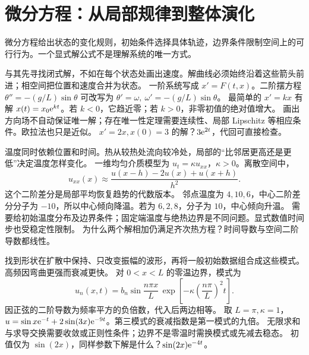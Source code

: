 \chapter{微分方程：从局部规律到整体演化}
微分方程给出状态的变化规则，初始条件选择具体轨迹，边界条件限制空间上的可行行为。一个显式解公式不是理解系统的唯一方式。

\idea 与其先寻找闭式解，不如在每个状态处画出速度。解曲线必须始终沿着这些箭头前进；相空间把位置和速度合并为状态。
\mathpart 一阶系统写成 $x'=F(t,x)$。二阶摆方程 $\theta''=-(g/L)\sin\theta$ 可改写为 $\theta'=\omega,\ \omega'=-(g/L)\sin\theta$。
\examplepart 最简单的 $x'=kx$ 有解 $x(t)=x_0\mathrm e^{kt}$。若 $k<0$，它趋近零；若 $k>0$，非零初值的绝对值增大。
\pitfall 画出方向场不自动保证唯一解；存在唯一性定理需要连续性、局部 Lipschitz 等相应条件。欧拉法也只是近似。
\exercise $x'=2x,x(0)=3$ 的解？$3\mathrm e^{2t}$，代回可直接检查。
\nextlesson

\idea 温度同时依赖位置和时间。热从较热处流向较冷处，局部的“比邻居更高还是更低”决定温度怎样变化。
\mathpart 一维均匀介质模型为 $u_t=\kappa u_{xx}$，$\kappa>0$。离散空间中，
\[u_{xx}(x)\approx\frac{u(x-h)-2u(x)+u(x+h)}{h^2}.\]
这个二阶差分是局部平均恢复趋势的代数版本。
\examplepart 邻点温度为 $4,10,6$，中心二阶差分分子为 $-10$，所以中心倾向降温。若为 $6,2,8$，分子为 $10$，中心倾向升温。
\pitfall 需要给初始温度分布及边界条件；固定端温度与绝热边界是不同问题。显式数值时间步也受稳定性限制。
\exercise 为什么两个解相加仍满足齐次热方程？时间导数与空间二阶导数都线性。
\nextlesson

\idea 找到形状在扩散中保持、只改变振幅的波形，再将一般初始数据组合成这些模式。高频因弯曲更强而衰减更快。
\mathpart 对 $0<x<L$ 的零温边界，模式为
\[u_n(x,t)=b_n\sin\frac{n\pi x}{L}\,
\exp\!\left[-\kappa\left(\frac{n\pi}{L}\right)^2t\right].\]
因正弦的二阶导数为频率平方的负倍数，代入后两边相等。
\examplepart 取 $L=\pi,\kappa=1$，$u=\sin x\mathrm e^{-t}+2\sin(3x)\mathrm e^{-9t}$。第三模式的衰减指数是第一模式的九倍。
\pitfall 无限求和与求导交换需要收敛或正则性条件；边界不是零温时需换模式或先减去稳态。
\exercise 初值仅为 $\sin(2x)$，同样参数下解是什么？$\sin(2x)\mathrm e^{-4t}$。
\nextlesson

